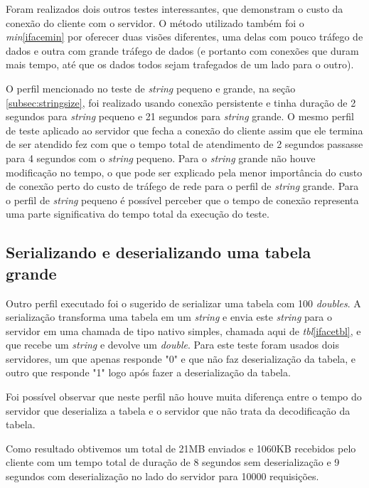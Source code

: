 \documentclass[11pt]{article}
\begin{document}
Foram realizados dois outros testes interessantes, que demonstram o custo da
conexão do cliente com o servidor. O método utilizado também foi o
\textit{min}\ref{ifacemin} por oferecer duas visões diferentes, uma delas com
pouco tráfego de dados e outra com grande tráfego de dados (e portanto com
conexões que duram mais tempo, até que os dados todos sejam trafegados de um
lado para o outro).

O perfil mencionado no teste de \textit{string} pequeno e grande, na seção
\ref{subsec:stringsize}, foi realizado usando conexão persistente e tinha
duração de 2 segundos para \textit{string} pequeno e 21 segundos para
\textit{string} grande. O mesmo perfil de teste aplicado ao servidor que fecha
a conexão do cliente assim que ele termina de ser atendido fez com que o tempo
total de atendimento de 2 segundos passasse para 4 segundos com o
\textit{string} pequeno. Para o \textit{string} grande não houve modificação no
tempo, o que pode ser explicado pela menor importância do custo de conexão
perto do custo de tráfego de rede para o perfil de \textit{string} grande.
Para o perfil de \textit{string} pequeno é possível perceber que o tempo de
conexão representa uma parte significativa do tempo total da execução do teste.

\subsection{Serializando e deserializando uma tabela grande}\label{subsec:serdeser}

Outro perfil executado foi o sugerido de serializar uma tabela com 100
\textit{doubles}. A serialização transforma uma tabela em um \textit{string} e
envia este \textit{string} para o servidor em uma chamada de tipo nativo
simples, chamada aqui de \textit{tbl}\ref{ifacetbl}, e que recebe um \textit{string} e
devolve um \textit{double}. Para este teste foram usados dois servidores, um
que apenas responde "0" e que não faz deserialização da tabela, e outro que
responde "1" logo após fazer a deserialização da tabela.

Foi possível observar que neste perfil não houve muita diferença entre o tempo
do servidor que deserializa a tabela e o servidor que não trata da
decodificação da tabela.

Como resultado obtivemos um total de 21MB enviados e 1060KB recebidos pelo
cliente com um tempo total de duração de 8 segundos sem deserialização e 9
segundos com deserialização no lado do servidor para 10000 requisições.
\end{document}
